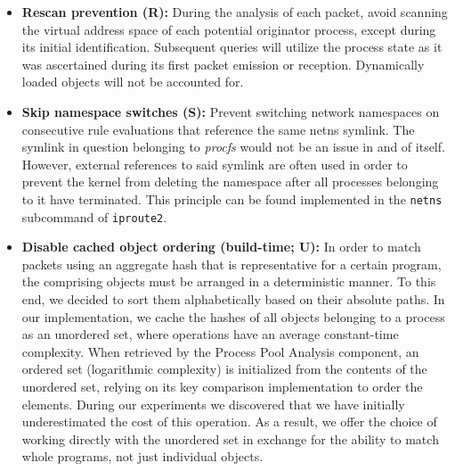 \begin{itemize}
    \item \textbf{Rescan prevention (R):} During the analysis of each packet, avoid scanning the virtual address space of each potential originator process, except during its initial identification. Subsequent queries will utilize the process state as it was ascertained during its first packet emission or reception. Dynamically loaded objects will not be accounted for.

    \item \textbf{Skip namespace switches (S):} Prevent switching network namespaces on consecutive rule evaluations that reference the same netns symlink. The symlink in question belonging to \textit{procfs} would not be an issue in and of itself. However, external references to said symlink are often used in order to prevent the kernel from deleting the namespace after all processes belonging to it have terminated. This principle can be found implemented in the \texttt{netns} subcommand of \texttt{iproute2}.

    \item \textbf{Disable cached object ordering (build-time; U):} In order to match packets using an aggregate hash that is representative for a certain program, the comprising objects must be arranged in a deterministic manner. To this end, we decided to sort them alphabetically based on their absolute paths. In our implementation, we cache the hashes of all objects belonging to a process as an unordered set, where operations have an average constant-time complexity. When retrieved by the Process Pool Analysis component, an ordered set (logarithmic complexity) is initialized from the contents of the unordered set, relying on its key comparison implementation to order the elements. During our experiments we discovered that we have initially underestimated the cost of this operation. As a result, we offer the choice of working directly with the unordered set in exchange for the ability to match whole programs, not just individual objects.


\end{itemize}
